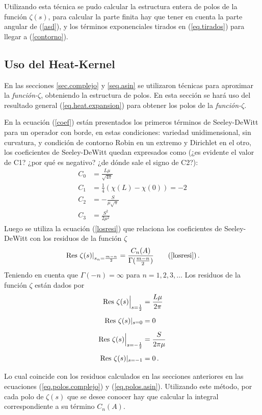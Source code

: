 Utilizando esta técnica se pudo calcular la estructura entera de polos de la función $\zeta (s)$, para calcular la parte finita hay que tener en cuenta la parte angular de (\ref{asd}), y los términos exponenciales tirados en (\ref{eq.tirados}) para llegar a (\ref{contorno}).


\subsection{Uso del Heat-Kernel}

En las secciones \ref{sec.complejo} y \ref{seq.asin} se utilizaron técnicas para aproximar la {\it función-$\zeta$}, obteniendo la estructura de polos. En esta sección se hará uso del resultado general (\ref{eq.heat.expansion}) para obtener los polos de la {\it función-$\zeta$}.

En la ecuación (\ref{coef}) están presentados los primeros términos de Seeley-DeWitt para un operador con borde, en estas condiciones: variedad unidimensional, sin curvatura, y condición de contorno Robin en un extremo y Dirichlet en el otro, los coeficientes de Seeley-DeWitt quedan expresados como {\red(¿es evidente el valor de C1? ¿por qué es negativo? ¿de dónde sale el signo de C2?)}:
\begin{equation}
\begin{aligned}
C _0 &=  \frac{L \mu}{\sqrt{4 \pi} }\\
C _1 &=  \frac{1}{4} \left( \chi (L) - \chi (0) \right) =  -2 \\
C _2 &= - \frac{S}{\mu \sqrt{\pi} } \\
C _3 &= \frac{ S ^2 }{2 \mu ^2 }
\end{aligned}
\end{equation}
Luego se utiliza la ecuación (\ref{losresi}) que relaciona los coeficientes de Seeley-DeWitt con los residuos de la función $\zeta$
\begin{equation}
\left. {\rm Res} \ \zeta  (s)  \right| _{s_n= \frac{m - n}{2}} =  
\frac{ C_n  (A) }{ {\Gamma ( \frac{m-n}{2}} ) }
\tag{\ref{losresi}}
\, .
\end{equation}
Teniendo en cuenta que $\Gamma (-n) = \infty$ para $n = 1,2,3, \dots  $ Los residuos de la función $\zeta$ están dados por
\begin{equation}
\begin{aligned}
{\rm Res} \  \zeta  (s)  \Big| _{s=\frac{1}{2}} &= \frac{L \mu}{2 \pi} \\[5pt]
{\rm Res} \  \zeta  (s)  | _{s=0} &= 0 \\[5pt]
{\rm Res} \ \zeta (s) \Big| _{s= - \frac{1}{2}} &= \frac{S}{2 \pi \mu} \\[5pt]
{\rm Res} \  \zeta  (s) | _{s=-1} &= 0 \, . \\[5pt]
\end{aligned}
\end{equation}
Lo cual coincide con los residuos calculados en las secciones anteriores en las ecuaciones (\ref{eq.polos.complejo}) y (\ref{eq.polos.asin}). Utilizando este método, por cada polo de $\zeta (s)$ que se desee conocer hay que calcular la integral correspondiente a su término $C _n (A)$.

